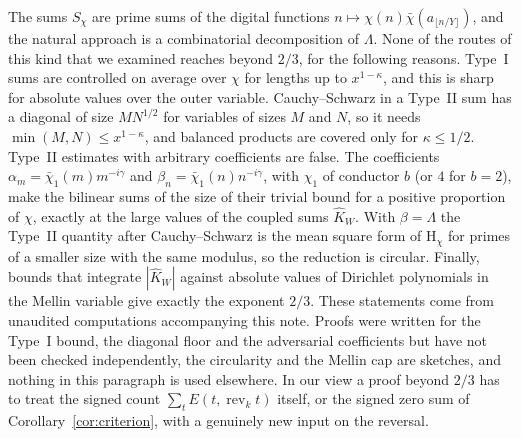 \documentclass[11pt]{amsart}
\theoremstyle{definition}
\numberwithin{equation}{section}
\newcommand{\rev}{\operatorname{rev}}
\begin{document}
The sums $S_\chi$ are prime sums of the digital functions $n\mapsto\chi(n)\bar\chi(a_{\lfloor n/Y\rfloor})$, and the natural approach is a combinatorial decomposition of $\Lambda$. None of the routes of this kind that we examined reaches beyond $2/3$, for the following reasons. Type~I sums are controlled on average over $\chi$ for lengths up to $x^{1-\kappa}$, and this is sharp for absolute values over the outer variable. Cauchy--Schwarz in a Type~II sum has a diagonal of size $MN^{1/2}$ for variables of sizes $M$ and $N$, so it needs $\min(M,N)\le x^{1-\kappa}$, and balanced products are covered only for $\kappa\le1/2$. Type~II estimates with arbitrary coefficients are false. The coefficients $\alpha_m=\bar\chi_1(m)m^{-i\gamma}$ and $\beta_n=\bar\chi_1(n)n^{-i\gamma}$, with $\chi_1$ of conductor $b$ (or $4$ for $b=2$), make the bilinear sums of the size of their trivial bound for a positive proportion of $\chi$, exactly at the large values of the coupled sums $\hat K_W$. With $\beta=\Lambda$ the Type~II quantity after Cauchy--Schwarz is the mean square form of $\mathrm H_\chi$ for primes of a smaller size with the same modulus, so the reduction is circular. Finally, bounds that integrate $|\hat K_W|$ against absolute values of Dirichlet polynomials in the Mellin variable give exactly the exponent $2/3$. These statements come from unaudited computations accompanying this note. Proofs were written for the Type~I bound, the diagonal floor and the adversarial coefficients but have not been checked independently, the circularity and the Mellin cap are sketches, and nothing in this paragraph is used elsewhere. In our view a proof beyond $2/3$ has to treat the signed count $\sum_t E(t,\rev_kt)$ itself, or the signed zero sum of Corollary~\ref{cor:criterion}, with a genuinely new input on the reversal.
\end{document}
